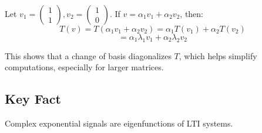 \begin{example}
    Let $v_1 = \begin{pmatrix} 1 \\ 1 \end{pmatrix}, v_2 = \begin{pmatrix} 1 \\ 0 \end{pmatrix}$. If $v = \alpha_1 v_1 + \alpha_2 v_2$, then:
    \[
    T(v) = T(\alpha_1 v_1 + \alpha_2 v_2) = \alpha_1 T(v_1) + \alpha_2 T(v_2)
    \]
    \[
    = \alpha_1 \lambda_1 v_1 + \alpha_2 \lambda_2 v_2
    \]
\end{example}

\begin{intuition}
    This shows that a change of basis diagonalizes $T$, which helps simplify computations, especially for larger matrices.
\end{intuition}

\subsection{Key Fact}
\begin{definition}
    Complex exponential signals are eigenfunctions of LTI systems.

\end{definition}

